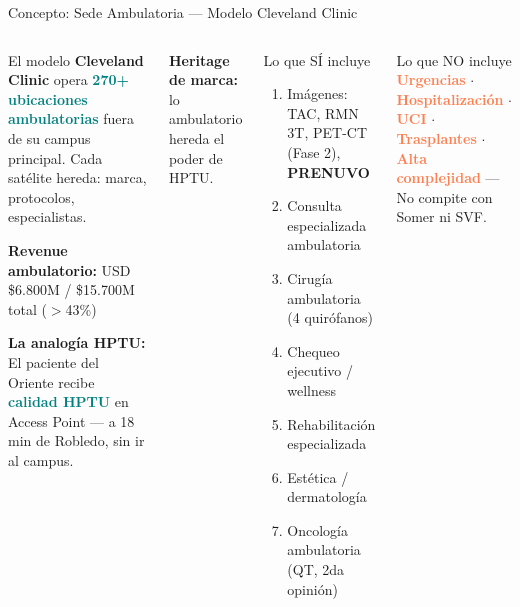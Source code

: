 \documentclass[aspectratio=169, 11pt]{beamer}
\newcommand{\highlight}[1]{\textcolor{teal}{\textbf{#1}}}
\newcommand{\danger}[1]{\textcolor{coral}{\textbf{#1}}}
\begin{document}
{
\begin{frame}{Concepto: Sede Ambulatoria --- Modelo Cleveland Clinic}
\begin{columns}[T]
\begin{block}{\small El modelo}
\scriptsize
\textbf{Cleveland Clinic} opera \highlight{270+ ubicaciones ambulatorias} fuera de su campus principal. Cada satélite hereda: marca, protocolos, especialistas.

\vspace{2pt}
\textbf{Revenue ambulatorio:} USD \$6.800M / \$15.700M total ($>$43\%)

\vspace{3pt}
\textbf{La analogía HPTU:}\\
El paciente del Oriente recibe \highlight{calidad HPTU} en Access Point --- a 18 min de Robledo, sin ir al campus.
\end{block}

\vspace{2pt}
{\scriptsize\textbf{Heritage de marca:} lo ambulatorio hereda el poder de HPTU.}

\begin{exampleblock}{\small Lo que SÍ incluye}
\scriptsize
\begin{enumerate}\setlength{\itemsep}{0pt}
  \item Imágenes: TAC, RMN 3T, PET-CT (Fase 2), \textbf{PRENUVO}
  \item Consulta especializada ambulatoria
  \item Cirugía ambulatoria (4 quirófanos)
  \item Chequeo ejecutivo / wellness
  \item Rehabilitación especializada
  \item Estética / dermatología
  \item Oncología ambulatoria (QT, 2da opinión)
\end{enumerate}
\end{exampleblock}

\begin{alertblock}{\small Lo que NO incluye}
\scriptsize
\danger{Urgencias} $\cdot$ \danger{Hospitalización} $\cdot$ \danger{UCI} $\cdot$ \danger{Trasplantes} $\cdot$ \danger{Alta complejidad} --- No compite con Somer ni SVF.
\end{alertblock}
\end{columns}
\end{frame}
}
\end{document}
